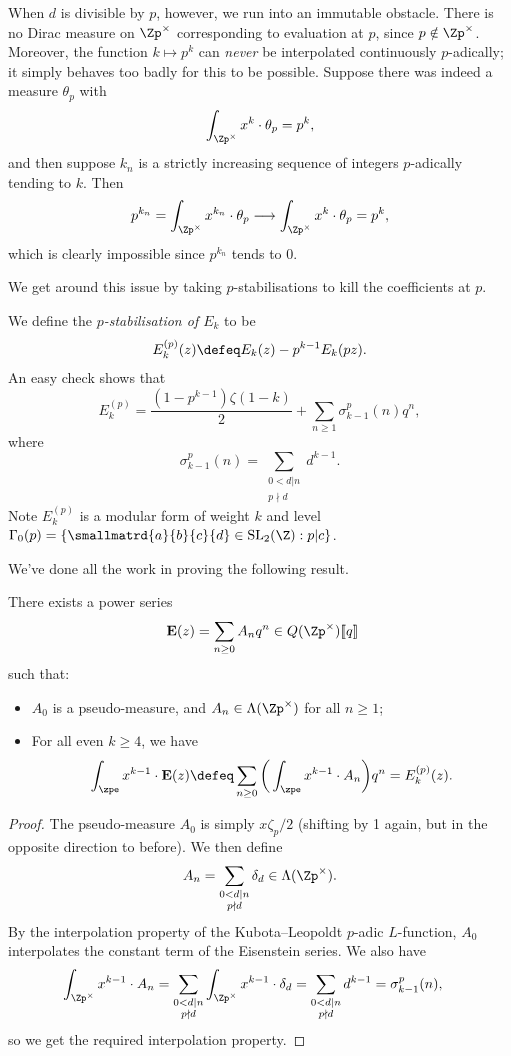 \documentclass[a4paper,10pt, english, reqno]{smfart}
\newcommand{\lsem}{[\! [}
\newcommand{\rsem}{]\! ]}
\numberwithin{equation}{section}
\begin{document}
When $d$ is divisible by $p$, however, we run into an immutable obstacle. There is no Dirac measure on $\Zp^\times$ corresponding to evaluation at $p$, since $p \notin \Zp^\times$. Moreover, the function $k \mapsto p^k$ can \emph{never} be interpolated continuously $p$-adically; it simply behaves too badly for this to be possible. Suppose there was indeed a measure $\theta_p$ with 
\[\int_{\Zp^\times} x^k \cdot \theta_p = p^k,\]
and then suppose $k_n$ is a strictly increasing sequence of integers $p$-adically tending to $k$. Then 
\[p^{k_n} = \int_{\Zp^\times}x^{k_n} \cdot \theta_p \longrightarrow \int_{\Zp^\times}x^{k} \cdot \theta_p = p^k,\]
which is clearly impossible since $p^{k_n}$ tends to 0.

We get around this issue by taking $p$-stabilisations to kill the coefficients at $p$.

\begin{definition}
 We define the \emph{$p$-stabilisation of $E_k$} to be 
\[E_k^{(p)}(z) \defeq E_k(z) - p^{k-1}E_k(pz).\]
An easy check shows that
\[E_{k}^{(p)} = \frac{(1-p^{k-1})\zeta(1-k)}{2} + \sum_{n\geq 1}\sigma_{k-1}^p(n)q^n,\]
where
\[\sigma_{k-1}^p(n) = \sum_{\substack{0< d|n\\ p\nmid d}} d^{k-1}.\]
Note $E_{k}^{(p)}$ is a modular form of weight $k$ and level $\Gamma_0(p) = \{\smallmatrd{a}{b}{c}{d} \in \mathrm{SL}_2(\Z) : p|c\}$.
\end{definition}

We've done all the work in proving the following result.

\begin{theorem} There exists a power series
\[\ \mathbf{E}(z) = \sum_{n\geq 0} A_n q^n \in Q(\Zp^\times)\lsem q\rsem  \]
such that:
\begin{itemize}
\item[(a)] $A_0$ is a pseudo-measure, and $A_n \in \Lambda(\Zp^\times)$ for all $n\geq 1$;
\item[(b)] For all even $k \geq 4$, we have
\[ \int_{\zpe} x^{k-1} \cdot \mathbf{E}(z) \defeq \sum_{n\geq 0} \bigg( \int_{\zpe} x^{k-1} \cdot A_n \bigg) q^n  = E_k^{(p)}(z). \]
\end{itemize}
\end{theorem}

\begin{proof}
The pseudo-measure $A_0$ is simply $x\zeta_p/2$ (shifting by 1 again, but in the opposite direction to before). We then define 
\[A_n = \sum_{\substack{0< d|n\\ p\nmid d}} \delta_d \in \Lambda(\Zp^\times).\]
By the interpolation property of the Kubota--Leopoldt $p$-adic $L$-function, $A_0$ interpolates the constant term of the Eisenstein series. We also have
\begin{align*}\int_{\Zp^\times}x^{k-1}\cdot A_n &= \sum_{\substack{0< d|n\\ p\nmid d}} \int_{\Zp^\times} x^{k-1} \cdot \delta_d = \sum_{\substack{0< d|n\\ p\nmid d}}  d^{k-1} = \sigma_{k-1}^{p}(n),
\end{align*}
so we get the required interpolation property.
\end{proof}
\end{document}
